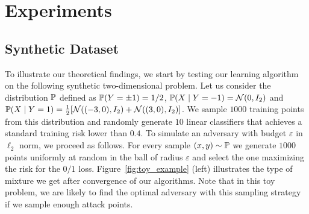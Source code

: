 
\section{Experiments}

\subsection{Synthetic Dataset}


To illustrate our theoretical findings, we start by testing our learning algorithm on the following synthetic two-dimensional problem. Let us consider the distribution $\mathbb{P}$ defined as  $\PP\left(Y =\pm 1\right)=1/2$, $\PP\left(X\mid Y=-1\right) = \mathcal{N}(0,I_2)$ and $\PP\left(X \mid Y=1\right) = \frac12\left[\mathcal{N}((-3,0),I_2)+\mathcal{N}((3,0),I_2) \right]$.
We sample $1000$ training points from this distribution and randomly generate $10$ linear classifiers that achieves a standard training risk lower than $0.4$. To simulate an adversary with budget $\varepsilon$ in $\ell_2$ norm, we proceed as follows. For every sample $(x,y)\sim \mathbb{P}$ we generate $1000$ points uniformly at random in the ball of radius $\varepsilon$ and select the one maximizing the risk for the $0/1$ loss. Figure~\ref{fig:toy_example} (left) illustrates the type of mixture we get after convergence of our algorithms. Note that in this toy problem, we are likely to find the optimal adversary with this sampling strategy if we sample enough attack points. 
